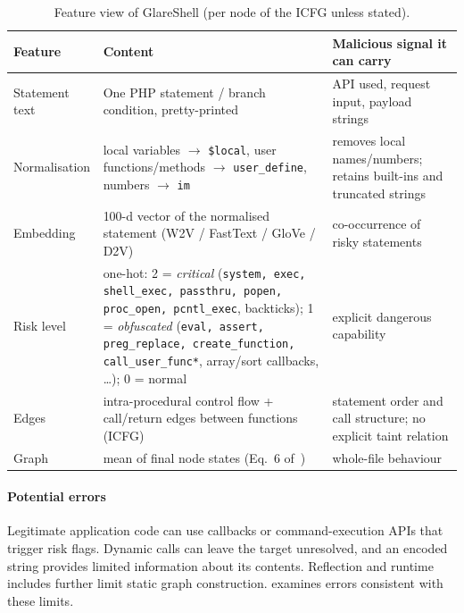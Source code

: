 \begin{table}[!t]
\centering\small
\caption{Feature view of GlareShell (per node of the ICFG unless stated).}
\label{tab:features}
\begin{tabularx}{\linewidth}{@{}lXl@{}}
\toprule
Feature & Content & Malicious signal it can carry \\ \midrule
Statement text & One PHP statement / branch condition, pretty-printed & API used, request input, payload strings \\
Normalisation & local variables $\to$ \texttt{\$local}, user functions/methods $\to$ \texttt{user\_define}, numbers $\to$ \texttt{im} & removes local names/numbers; retains built-ins and truncated strings \\
Embedding & 100-d vector of the normalised statement (W2V / FastText / GloVe / D2V) & co-occurrence of risky statements \\
Risk level & one-hot: 2 = \emph{critical} (\texttt{system, exec, shell\_exec, passthru, popen, proc\_open, pcntl\_exec}, backticks); 1 = \emph{obfuscated} (\texttt{eval, assert, preg\_replace, create\_function, call\_user\_func*}, array/sort callbacks, \dots); 0 = normal & explicit dangerous capability \\
Edges & intra-procedural control flow + call/return edges between functions (ICFG) & statement order and call structure; no explicit taint relation \\
Graph & mean of final node states (Eq.~6 of~\paperref{}) & whole-file behaviour \\
\bottomrule
\end{tabularx}
\end{table}

\paragraph{Potential errors}
Legitimate application code can use callbacks or command-execution APIs that trigger risk flags. Dynamic
calls can leave the target unresolved, and an encoded string provides limited information about its
contents. Reflection and runtime includes further limit static graph construction. 
examines errors consistent with these limits.
